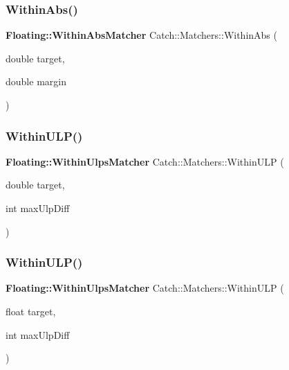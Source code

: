 \mbox{\label{namespace_catch_1_1_matchers_a4c9ea76d47d02de0cf2d354c87c26e95}} 
\subsubsection{WithinAbs()}
{\footnotesize\ttfamily \textbf{ Floating\+::\+Within\+Abs\+Matcher} Catch\+::\+Matchers\+::\+Within\+Abs (\begin{DoxyParamCaption}\item[{double}]{target,  }\item[{double}]{margin }\end{DoxyParamCaption})}

\mbox{\label{namespace_catch_1_1_matchers_ae895591bd78a7d0ce4cdf3cf40d89ab5}} 
\subsubsection{WithinULP()\hspace{0.1cm}{\footnotesize\ttfamily [1/2]}}
{\footnotesize\ttfamily \textbf{ Floating\+::\+Within\+Ulps\+Matcher} Catch\+::\+Matchers\+::\+Within\+U\+LP (\begin{DoxyParamCaption}\item[{double}]{target,  }\item[{int}]{max\+Ulp\+Diff }\end{DoxyParamCaption})}

\mbox{\label{namespace_catch_1_1_matchers_ab87ee77e5349fac450d1e631dee86496}} 
\subsubsection{WithinULP()\hspace{0.1cm}{\footnotesize\ttfamily [2/2]}}
{\footnotesize\ttfamily \textbf{ Floating\+::\+Within\+Ulps\+Matcher} Catch\+::\+Matchers\+::\+Within\+U\+LP (\begin{DoxyParamCaption}\item[{float}]{target,  }\item[{int}]{max\+Ulp\+Diff }\end{DoxyParamCaption})}

